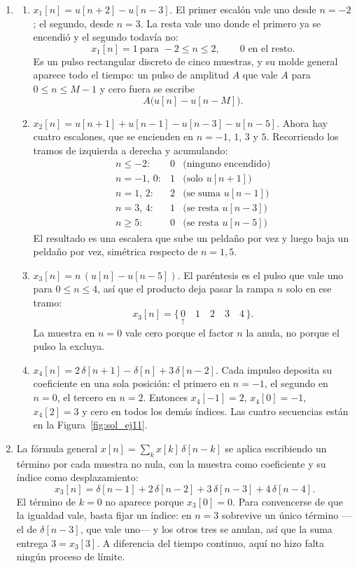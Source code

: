 \documentclass[10pt,a4paper]{article}
\begin{document}
	\begin{enumerate}
		\item \begin{enumerate}[label=\textup{\roman*.}, leftmargin=*, itemsep=4pt]
				\item $x_1[n]=u[n+2]-u[n-3]$. El primer escalón vale uno desde $n=-2$; el
			segundo, desde $n=3$. La resta vale uno donde el primero ya se encendió y el segundo
			todavía no:
			\[
				x_1[n]=1 \ \text{para } -2\leq n\leq 2, \qquad 0 \text{ en el resto}.
			\]
			Es un pulso rectangular discreto de cinco muestras, y su molde general aparece todo
			el tiempo: un pulso de amplitud $A$ que vale $A$ para
			$0\leq n\leq M-1$ y cero fuera se escribe
			\[
				A\big(u[n]-u[n-M]\big).
			\]

			\item $x_2[n]=u[n+1]+u[n-1]-u[n-3]-u[n-5]$. Ahora hay cuatro escalones, que se
			encienden en $n=-1$, $1$, $3$ y $5$. Recorriendo los tramos de izquierda a derecha y
			acumulando:
			\[
				\begin{array}{llll}
					n\leq -2: & 0 & \text{(ninguno encendido)} \\
					n=-1,\,0: & 1 & \text{(solo } u[n+1]) \\
					n=1,\,2:  & 2 & \text{(se suma } u[n-1]) \\
					n=3,\,4:  & 1 & \text{(se resta } u[n-3]) \\
					n\geq 5:  & 0 & \text{(se resta } u[n-5])
				\end{array}
			\]
			El resultado es una escalera que sube un peldaño por vez y luego baja un peldaño por vez,
			simétrica respecto de $n=1{,}5$.

			\item $x_3[n]=n\,(u[n]-u[n-5])$. El paréntesis es el pulso que vale uno para
			$0\leq n\leq 4$, así que el producto deja pasar la rampa $n$ solo en ese tramo:
			\[
				x_3[n] = \{\,\underset{\uparrow}{0}\quad 1\quad 2\quad 3\quad 4\,\}.
			\]
			La muestra en $n=0$ vale cero porque el factor $n$ la anula, no porque el pulso la
			excluya.

			\item $x_4[n]=2\,\delta[n+1]-\delta[n]+3\,\delta[n-2]$. Cada impulso deposita su
			coeficiente en una sola posición: el primero en $n=-1$, el segundo en $n=0$, el tercero
			en $n=2$. Entonces $x_4[-1]=2$, $x_4[0]=-1$, $x_4[2]=3$ y cero en todos los demás
			índices. Las cuatro secuencias están en la Figura~\ref{fig:sol_ej11}.
		\end{enumerate}

		\item La fórmula general
		$x[n]=\sum_k x[k]\,\delta[n-k]$ se aplica escribiendo un término por cada muestra no
		nula, con la muestra como coeficiente y su índice como desplazamiento:
		\[
			\boxed{\;x_3[n] = \delta[n-1] + 2\,\delta[n-2] + 3\,\delta[n-3] + 4\,\delta[n-4].\;}
		\]
		El término de $k=0$ no aparece porque $x_3[0]=0$. Para convencerse de que la igualdad
		vale, basta fijar un índice: en $n=3$ sobrevive un único término ---el de
		$\delta[n-3]$, que vale uno--- y los otros tres se anulan, así que la suma entrega
		$3 = x_3[3]$. A diferencia del tiempo continuo, aquí no hizo falta ningún proceso de
		límite.
	\end{enumerate}
\end{document}
